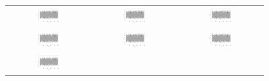 \begin{figure}
\begin{tabular}{ccc}
  \includegraphics[page=7,width=0.3\textwidth]{figures/cal_trace.pdf} &
  \includegraphics[page=8,width=0.3\textwidth]{figures/cal_trace.pdf} &
  \includegraphics[page=9,width=0.3\textwidth]{figures/cal_trace.pdf} \\
  \includegraphics[page=10,width=0.3\textwidth]{figures/cal_trace.pdf} &
  \includegraphics[page=11,width=0.3\textwidth]{figures/cal_trace.pdf} &
  \includegraphics[page=12,width=0.3\textwidth]{figures/cal_trace.pdf} \\
  \includegraphics[page=13,width=0.3\textwidth]{figures/cal_trace.pdf} &

\end{tabular}
\end{figure}
